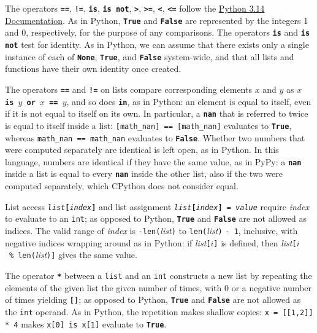 
The operators
    \texttt{\textbf{==}},
    \texttt{\textbf{!=}},
    \texttt{\textbf{is}},
    \texttt{\textbf{is not}},
    \texttt{\textbf{>}},
    \texttt{\textbf{>=}},
    \texttt{\textbf{<}},
    \texttt{\textbf{<=}}
    follow the 
    \href{https://docs.python.org/3.14}{\color{DarkBlue}Python 3.14 Documentation}.
    As in Python, \texttt{\textbf{True}} and \texttt{\textbf{False}} are
    represented by the integers 1 and 0, respectively, for the purpose of
    any comparisons. The operators \texttt{\textbf{is}} and \texttt{\textbf{is not}}
    test for identity. As in Python, we can assume that there exists only a single
    instance of each of \texttt{\textbf{None}}, \texttt{\textbf{True}},
    and \texttt{\textbf{False}} system-wide, and that all lists and functions have their
    own identity once created.

    The operators
    \texttt{\textbf{==}} and \texttt{\textbf{!=}} on lists compare corresponding
    elements $x$ and $y$ as \texttt{\textbf{$x$ is $y$ or $x$ == $y$}}, and so does
    \texttt{\textbf{in}}, as in Python: an element is equal to itself, even if it is
    not equal to itself on its own. In particular, a \texttt{\textbf{nan}} that is
    referred to twice is equal to itself inside a list:
    \texttt{[math\_nan] == [math\_nan]} evaluates to \texttt{\textbf{True}},
    whereas \texttt{math\_nan == math\_nan} evaluates to \texttt{\textbf{False}}.
    Whether two numbers that were computed separately are identical is left open, as in Python.
    In this language, numbers are identical if they have the same value, as in PyPy: a
    \texttt{\textbf{nan}} inside a list is equal to every \texttt{\textbf{nan}} inside the other
    list, also if the two were computed separately, which CPython does not consider equal.

    List access \texttt{\textit{list}\texttt{\textbf{[}}\textit{index}\texttt{\textbf{]}}}
    and list assignment
    \texttt{\textit{list}\texttt{\textbf{[}}\textit{index}\texttt{\textbf{]} = }\textit{value}}
    require \textit{index} to evaluate to an \texttt{int}; as opposed to Python,
    \texttt{\textbf{True}} and \texttt{\textbf{False}} are not allowed as indices.
    The valid range of \textit{index} is \texttt{-len(}\textit{list}\texttt{)} to
    \texttt{len(}\textit{list}\texttt{)} \texttt{- 1}, inclusive, with negative
    indices wrapping around as in Python: if \textit{list}\texttt{[}$i$\texttt{]}
    is defined, then \textit{list}\texttt{[}$i$~\texttt{\%}~\texttt{len(}\textit{list}\texttt{)]}
    gives the same value.

    The operator \texttt{\textbf{*}} between a \texttt{list} and an \texttt{int}
    constructs a new list by repeating the elements of the given list the given
    number of times, with 0 or a negative number of times yielding
    \texttt{\textbf{[]}}; as opposed to Python, \texttt{\textbf{True}} and
    \texttt{\textbf{False}} are not allowed as the \texttt{int} operand. As in
    Python, the repetition makes shallow copies: \texttt{x = [[1,2]] * 4} makes
    \texttt{x[0] is x[1]} evaluate to \texttt{\textbf{True}}.

